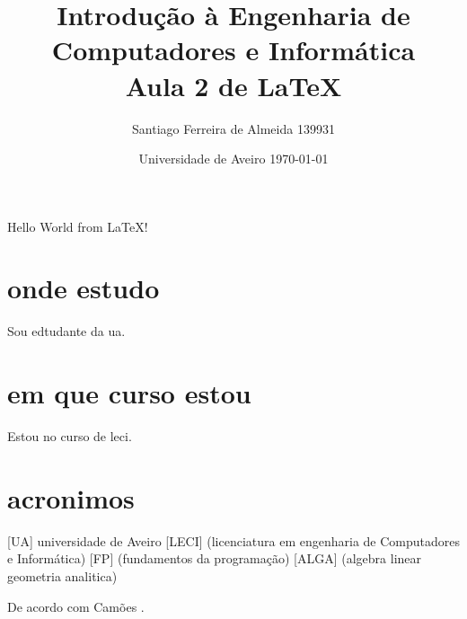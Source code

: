 \documentclass[]{report}
\title{\textbf{Introdução à Engenharia de Computadores e Informática \\ Aula 2 de \LaTeX}}
\author{Santiago Ferreira de Almeida 139931}
\date{Universidade de Aveiro \today}
\begin{document}
\maketitle
\tableofcontents

Hello World from \LaTeX!\\



\chapter*{onde estudo}
Sou edtudante da \ac{ua}.
\chapter{em que curso estou}
Estou no curso de \ac{leci}.
\chapter*{acronimos}
\begin{acronym}
 [UA] {universidade de Aveiro}
 [LECI] (licenciatura em engenharia de Computadores e Informática)
 [FP] (fundamentos da programação)
 [ALGA] (algebra linear geometria analitica)
\end{acronym}
De acordo com Camões \cite{lusiadas}.


\end{document}
